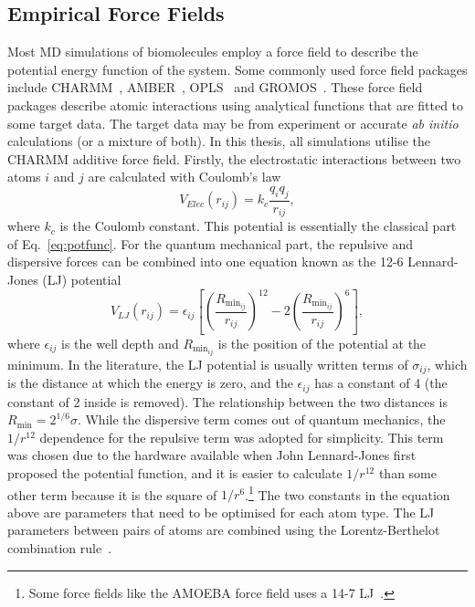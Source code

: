 \subsection{Empirical Force Fields}
\label{sec:forcefield}
Most MD simulations of biomolecules employ a force field to describe the potential energy 
function of the system. Some commonly used force field packages include CHARMM~\cite{MacKerell1998}, 
AMBER~\cite{Hornak2006}, OPLS~\cite{Jorgensen1996} and GROMOS~\cite{Horta2011}. These force 
field packages describe atomic interactions using analytical functions that are fitted to 
some target data. The target data may be from experiment or accurate {\it ab initio} 
calculations (or a mixture of both). In this thesis, all simulations utilise the CHARMM 
additive force field. Firstly, the electrostatic interactions between two atoms $i$ and $j$ 
are calculated with Coulomb's law
\begin{equation}
V_{Elec}(r_{ij}) = k_{c}\frac{q_{i}q_{j}}{r_{ij}},
\end{equation}
where $k_{c}$ is the Coulomb constant. This potential is essentially the classical part of 
Eq.~\eqref{eq:potfunc}.  For the quantum mechanical part, the repulsive and dispersive forces 
can be combined into one equation known as the 12-6 Lennard-Jones (LJ) potential
\begin{equation}
V_{LJ}(r_{ij}) = \epsilon_{ij}\left[\left(\frac{R_{\text{min}_{ij}}}{r_{ij}}\right)^{12} - 2\left(\frac{R_{\text{min}_{ij}}}{r_{ij}}\right)^{6} \right],
\label{eq:LJ}
\end{equation}
where $\epsilon_{ij}$ is the well depth and $R_{\text{min}_{ij}}$ is the position of the 
potential at the minimum. In the literature, the LJ potential is usually written terms of 
$\sigma_{ij}$, which is the distance at which the energy is zero, and the $\epsilon_{ij}$ 
has a constant of 4 (the constant of 2 inside is removed). The relationship between the two 
distances is $R_{\text{min}}=2^{1/6}\sigma$. While the dispersive term comes out of quantum 
mechanics, the $1/r^{12}$ dependence for the repulsive term was adopted for simplicity. This 
term was chosen due to the hardware available when John Lennard-Jones first proposed the 
potential function, and it is easier to calculate $1/r^{12}$ than some other term because 
it is the square of $1/r^{6}$.\footnote{Some force fields like the AMOEBA force field uses 
a 14-7 LJ~\cite{Ponder2010}.} The two constants in the 
equation above are parameters that need to be optimised for each atom type. The LJ parameters 
between pairs of atoms are combined using the Lorentz-Berthelot combination rule~\cite{Allen1987}. 

